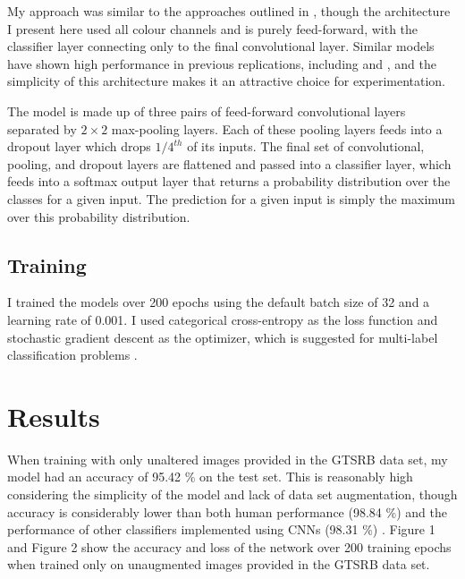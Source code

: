 \documentclass[letterpaper,twocolumn,10pt]{article}
\begin{document}
My approach was similar to the approaches outlined in \cite{sermanet_convolutional_2012, sermanet_traffic_2011}, though the architecture I present here used all colour channels and is purely feed-forward, with the classifier layer connecting only to the final convolutional layer. Similar models have shown high performance in previous replications, including \cite{keras_traffic} and \cite{tensorflow_traffic}, and the simplicity of this architecture makes it an attractive choice for experimentation.

The model is made up of three pairs of feed-forward convolutional layers separated by $2 \times 2$ max-pooling layers. Each of these pooling layers feeds into a dropout layer which drops $1/4^{th}$ of its inputs. The final set of convolutional, pooling, and dropout layers are flattened and passed into a classifier layer, which feeds into a softmax output layer that returns a probability distribution over the classes for a given input. The prediction for a given input is simply the maximum over this probability distribution.

\subsection{Training}

I trained the models over 200 epochs using the default batch size of 32 and a learning rate of 0.001. I used categorical cross-entropy as the loss function and stochastic gradient descent as the optimizer, which is suggested for multi-label classification problems \cite{lasagne_loss}.

\section{Results}

When training with only unaltered images provided in the GTSRB data set, my model had an accuracy of 95.42 \% on the test set. This is reasonably high considering the simplicity of the model and lack of data set augmentation, though accuracy is considerably lower than both human performance (98.84 \%) and the performance of other classifiers implemented using CNNs (98.31 \%) \cite{sermanet_convolutional_2012, sermanet_traffic_2011, stallkamp_german_2011, stallkamp_man_2012}. Figure 1 and Figure 2 show the accuracy and loss of the network over 200 training epochs when trained only on unaugmented images provided in the GTSRB data set.
\end{document}
